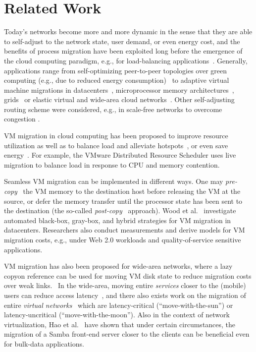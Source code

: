 \documentclass[conference]{IEEEtran}
\begin{document}
\section{Related Work}\label{sec:relwork}

Today's networks become more and more dynamic in the sense that they are able to self-adjust to the network state, user demand,
or even energy cost, and the benefits of process migration have been exploited long before
the emergence of the cloud computing paradigm, e.g., for load-balancing
applications~\cite{migration-early}. Generally, applications range from
self-optimizing peer-to-peer topologies over green computing (e.g.,
due to reduced energy consumption)~\cite{elastictree} to
adaptive virtual machine migrations in
datacenters~\cite{Shang2010Energy-aware}, microprocessor memory
architectures~\cite{lis2011brief}, grids~\cite{batista2007self} or elastic virtual and wide-area cloud networks~\cite{ucc12mip}.
Other self-adjusting routing scheme were considered, e.g., in
scale-free networks to overcome congestion \cite{PhysRevE.80.026114}.

VM migration in cloud computing has been proposed to improve resource utilization as well as to balance load
and alleviate hotspots~\cite{seffi-vm-migration}, or even save energy~\cite{elastictree}. For example, the VMware Distributed
Resource Scheduler uses live migration to balance load in
response to CPU and memory contention.

Seamless VM migration can be implemented in different ways.
One may \emph{pre-copy}~\cite{ref3} the
VM memory to the destination host before releasing
the VM at the source,  or defer the memory transfer until the processor state has been sent
to the destination (the so-called \emph{post-copy}~\cite{ref9} approach).
Wood et al.~\cite{sandpiper} investigate automated black-box, gray-box, and hybrid strategies for VM
migration in datacenters.
Researchers also conduct measurements and derive models for VM migration costs, e.g., under Web 2.0 workloads and quality-of-service sensitive applications.~\cite{mess}

VM migration has also been proposed for wide-area networks, where a lazy copyon
reference can be used for moving VM disk state to reduce migration costs over weak links.~\cite{wood-wan}
In the wide-area, moving entire \emph{services} closer to the (mobile) users can reduce access latency~\cite{migton}, and there
 also exists work on the migration of entire \emph{virtual networks}~\cite{ucc12mip} which are latency-critical (``move-with-the-sun'')
 or latency-uncritical (``move-with-the-moon''). Also in the context of network virtualization,
Hao et al.~\cite{cloud-netvirt} have shown that under certain circumstances,
the migration
of a Samba front-end server closer to the clients can be beneficial
even for bulk-data applications.
\end{document}
